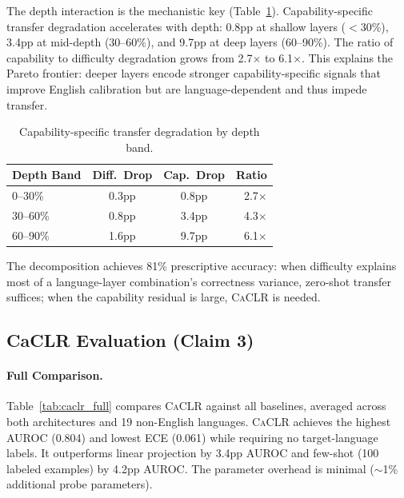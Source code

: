 \documentclass[11pt,a4paper]{article}
\newcommand{\caclr}{\textsc{CaCLR}}
\begin{document}
The depth interaction is the mechanistic key (Table~\ref{tab:decomp_depth}). Capability-specific transfer degradation accelerates with depth: 0.8pp at shallow layers ($<$30\%), 3.4pp at mid-depth (30--60\%), and 9.7pp at deep layers (60--90\%). The ratio of capability to difficulty degradation grows from 2.7$\times$ to 6.1$\times$. This explains the Pareto frontier: deeper layers encode stronger capability-specific signals that improve English calibration but are language-dependent and thus impede transfer.

\begin{table}[t]
\centering
\small
\caption{Capability-specific transfer degradation by depth band.}
\label{tab:decomp_depth}
\begin{tabular}{lccr}
\toprule
Depth Band & Diff.\ Drop & Cap.\ Drop & Ratio \\
\midrule
0--30\% & 0.3pp & 0.8pp & 2.7$\times$ \\
30--60\% & 0.8pp & 3.4pp & 4.3$\times$ \\
60--90\% & 1.6pp & 9.7pp & 6.1$\times$ \\
\bottomrule
\end{tabular}
\end{table}

The decomposition achieves 81\% prescriptive accuracy: when difficulty explains most of a language-layer combination's correctness variance, zero-shot transfer suffices; when the capability residual is large, \caclr{} is needed.

\subsection{CaCLR Evaluation (Claim 3)}
\label{sec:res_caclr}

\paragraph{Full Comparison.}
Table~\ref{tab:caclr_full} compares \caclr{} against all baselines, averaged across both architectures and 19 non-English languages. \caclr{} achieves the highest AUROC (0.804) and lowest ECE (0.061) while requiring no target-language labels. It outperforms linear projection by 3.4pp AUROC and few-shot (100 labeled examples) by 4.2pp AUROC. The parameter overhead is minimal ($\sim$1\% additional probe parameters).
\end{document}
